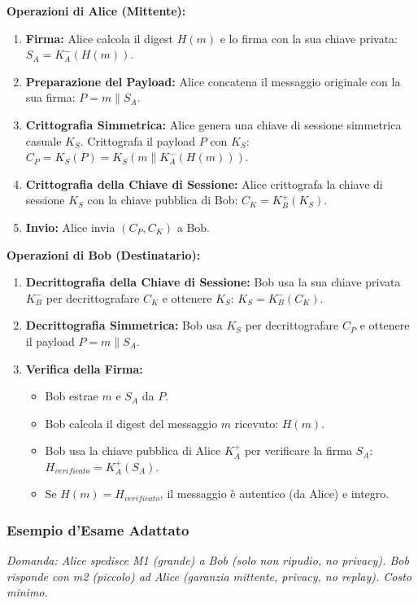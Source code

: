 \textbf{Operazioni di Alice (Mittente):}
\begin{enumerate}
    \item \textbf{Firma:} Alice calcola il digest $H(m)$ e lo firma con la sua chiave privata: $S_A = K_A^-(H(m))$.
    \item \textbf{Preparazione del Payload:} Alice concatena il messaggio originale con la sua firma: $P = m \| S_A$.
    \item \textbf{Crittografia Simmetrica:} Alice genera una chiave di sessione simmetrica casuale $K_S$. Crittografa il payload $P$ con $K_S$: $C_P = K_S(P) = K_S(m \| K_A^-(H(m)))$.
    \item \textbf{Crittografia della Chiave di Sessione:} Alice crittografa la chiave di sessione $K_S$ con la chiave pubblica di Bob: $C_K = K_B^+(K_S)$.
    \item \textbf{Invio:} Alice invia $(C_P, C_K)$ a Bob.
\end{enumerate}

\textbf{Operazioni di Bob (Destinatario):}
\begin{enumerate}
    \item \textbf{Decrittografia della Chiave di Sessione:} Bob usa la sua chiave privata $K_B^-$ per decrittografare $C_K$ e ottenere $K_S$: $K_S = K_B^-(C_K)$.
    \item \textbf{Decrittografia Simmetrica:} Bob usa $K_S$ per decrittografare $C_P$ e ottenere il payload $P = m \| S_A$.
    \item \textbf{Verifica della Firma:}
        \begin{itemize}
            \item Bob estrae $m$ e $S_A$ da $P$.
            \item Bob calcola il digest del messaggio $m$ ricevuto: $H(m)$.
            \item Bob usa la chiave pubblica di Alice $K_A^+$ per verificare la firma $S_A$: $H_{verificato} = K_A^+(S_A)$.
            \item Se $H(m) = H_{verificato}$, il messaggio è autentico (da Alice) e integro.
        \end{itemize}
\end{enumerate}

\subsubsection{Esempio d'Esame Adattato}
\textit{Domanda: Alice spedisce M1 (grande) a Bob (solo non ripudio, no privacy). Bob risponde con m2 (piccolo) ad Alice (garanzia mittente, privacy, no replay). Costo minimo.}

